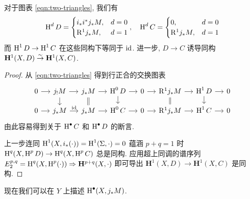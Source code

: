 \begin{lemma}\label{prop:two-triangles}
	对于图表 \eqref{eqn:two-triangles}, 我们有
	\[  \operatorname{H}^d D = \begin{cases}
		i_* i^* j_* M , & d=0 \\
		\mathrm{R}^1 j_* M, & d=1 \\
		\end{cases}, \quad
		\operatorname{H}^d C = \begin{cases}
		0, & d=0 \\
		\mathrm{R}^1 j_* M, & d=1 \\
	\end{cases} \]
	而 $\operatorname{H}^1 D \to \operatorname{H}^1 C$ 在这些同构下等同于 $\mathrm{id}$. 进一步, $D \to C$ 诱导同构 $\mathbf{H}^1(X, D) \stackrel{\sim}{\rightarrow} \mathbf{H}^1(X, C)$.
\end{lemma}
\begin{proof}
	从 \eqref{eqn:two-triangles} 得到行正合的交换图表
	\[\begin{tikzcd}[row sep=small, column sep=small]
		0 \arrow[r] & j_! M \arrow[r] \arrow[d] & j_* M \arrow[r] \arrow[equal, d] & \Hm^0 D \arrow[d] \arrow[r] & 0 \arrow[r] & \mathrm{R}^1 j_* M \arrow[r] \arrow[equal, d] & \Hm^1 D \arrow[d] \arrow[r] & 0 \\
		0 \arrow[r] & j_* M \arrow[r, "\identity"] & j_* M \arrow[r] & \Hm^0 C \arrow[r] & 0 \arrow[r] & \mathrm{R}^1 j_* M \arrow[r] & \Hm^1 C \arrow[r] & 0
	\end{tikzcd}\]
	由此容易得到关于 $\operatorname{H}^\bullet C$ 和 $\operatorname{H}^\bullet D$ 的断言.
	
	上一步连同 $\operatorname{H}^1(X, i_*(\cdot)) = \operatorname{H}^1(\Sigma, \cdot) = 0$ 蕴涵 $p+q=1$ 时 $\operatorname{H}^q(X, \operatorname{H}^p D) \to \operatorname{H}^q(X, \operatorname{H}^p C)$ 总是同构. 应用超上同调的谱序列 $E_2^{p, q} = \operatorname{H}^q(X, \operatorname{H}^p(\cdot)) \Rightarrow \mathbf{H}^{p+q}(X, \cdot)$ 即可导出 $\mathbf{H}^1(X, D) \to \mathbf{H}^1(X, C)$ 是同构.
\end{proof}

现在我们可以在 $Y$ 上描述 $\operatorname{H}^\bullet(X, j_* M)$.

